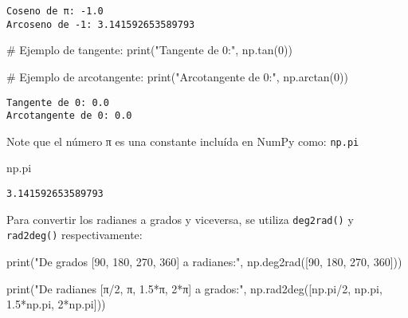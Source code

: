 \documentclass[
  letterpaper,
  DIV=11,
  numbers=noendperiod]{scrreprt}
\newenvironment{Shaded}{\begin{snugshade}}{\end{snugshade}}
\newcommand{\BuiltInTok}[1]{\textcolor[rgb]{0.00,0.23,0.31}{#1}}
\newcommand{\CommentTok}[1]{\textcolor[rgb]{0.37,0.37,0.37}{#1}}
\newcommand{\DecValTok}[1]{\textcolor[rgb]{0.68,0.00,0.00}{#1}}
\newcommand{\FloatTok}[1]{\textcolor[rgb]{0.68,0.00,0.00}{#1}}
\newcommand{\NormalTok}[1]{\textcolor[rgb]{0.00,0.23,0.31}{#1}}
\newcommand{\OperatorTok}[1]{\textcolor[rgb]{0.37,0.37,0.37}{#1}}
\newcommand{\StringTok}[1]{\textcolor[rgb]{0.13,0.47,0.30}{#1}}
\begin{document}
\begin{verbatim}
Coseno de π: -1.0
Arcoseno de -1: 3.141592653589793
\end{verbatim}

\begin{Shaded}
\begin{Highlighting}[]
\CommentTok{\# Ejemplo de tangente:}
\BuiltInTok{print}\NormalTok{(}\StringTok{"Tangente de 0:"}\NormalTok{, np.tan(}\DecValTok{0}\NormalTok{))}

\CommentTok{\# Ejemplo de arcotangente:}
\BuiltInTok{print}\NormalTok{(}\StringTok{"Arcotangente de 0:"}\NormalTok{, np.arctan(}\DecValTok{0}\NormalTok{))}
\end{Highlighting}
\end{Shaded}

\begin{verbatim}
Tangente de 0: 0.0
Arcotangente de 0: 0.0
\end{verbatim}

\begin{tcolorbox}[enhanced jigsaw, colframe=quarto-callout-note-color-frame, leftrule=.75mm, titlerule=0mm, left=2mm, bottomtitle=1mm, arc=.35mm, opacitybacktitle=0.6, toptitle=1mm, colbacktitle=quarto-callout-note-color!10!white, opacityback=0, breakable, title=\textcolor{quarto-callout-note-color}{\faInfo}\hspace{0.5em}{Note}, toprule=.15mm, rightrule=.15mm, colback=white, coltitle=black, bottomrule=.15mm]

Note que el número π es una constante incluída en NumPy como:
\texttt{np.pi}

\end{tcolorbox}

\begin{Shaded}
\begin{Highlighting}[]
\NormalTok{np.pi}
\end{Highlighting}
\end{Shaded}

\begin{verbatim}
3.141592653589793
\end{verbatim}

Para convertir los radianes a grados y viceversa, se utiliza
\texttt{deg2rad()} y \texttt{rad2deg()} respectivamente:

\begin{Shaded}
\begin{Highlighting}[]
\BuiltInTok{print}\NormalTok{(}\StringTok{"De grados [90, 180, 270, 360] a radianes:"}\NormalTok{, }
\NormalTok{      np.deg2rad([}\DecValTok{90}\NormalTok{, }\DecValTok{180}\NormalTok{, }\DecValTok{270}\NormalTok{, }\DecValTok{360}\NormalTok{]))}

\BuiltInTok{print}\NormalTok{(}\StringTok{"De radianes [π/2, π, 1.5*π, 2*π] a grados:"}\NormalTok{, }
\NormalTok{      np.rad2deg([np.pi}\OperatorTok{/}\DecValTok{2}\NormalTok{, np.pi, }\FloatTok{1.5}\OperatorTok{*}\NormalTok{np.pi, }\DecValTok{2}\OperatorTok{*}\NormalTok{np.pi]))}
\end{Highlighting}
\end{Shaded}
\end{document}
